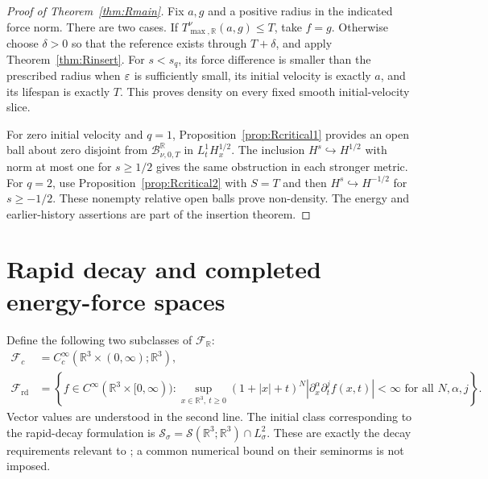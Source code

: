 \documentclass[11pt,a4paper]{article}
\theoremstyle{definition}\newtheorem{definition}[theorem]{Definition}
\theoremstyle{remark}\newtheorem{remark}[theorem]{Remark}
\newcommand{\R}{\mathbb R}\newcommand{\TT}{\mathbb T^3}
\begin{document}
\begin{proof}[Proof of Theorem~\ref{thm:Rmain}]
Fix $a,g$ and a positive radius in the indicated force norm. There are two cases. If $T^\nu_{\max,\R}(a,g)\le T$, take $f=g$. Otherwise choose $\delta>0$ so that the reference exists through $T+\delta$, and apply Theorem~\ref{thm:Rinsert}. For $s<s_q$, its force difference is smaller than the prescribed radius when $\varepsilon$ is sufficiently small, its initial velocity is exactly $a$, and its lifespan is exactly $T$. This proves density on every fixed smooth initial-velocity slice.

For zero initial velocity and $q=1$, Proposition~\ref{prop:Rcritical1} provides an open ball about zero disjoint from $\mathcal B^\R_{\nu,0,T}$ in $L^1_tH^{1/2}_x$. The inclusion $H^s\hookrightarrow H^{1/2}$ with norm at most one for $s\ge1/2$ gives the same obstruction in each stronger metric. For $q=2$, use Proposition~\ref{prop:Rcritical2} with $S=T$ and then $H^s\hookrightarrow H^{-1/2}$ for $s\ge-1/2$. These nonempty relative open balls prove non-density. The energy and earlier-history assertions are part of the insertion theorem.
\end{proof}

\section{Rapid decay and completed energy-force spaces}
Define the following two subclasses of $\mathcal F_{\R}$:
\begin{align*}
 \mathcal F_c&=C_c^\infty(\R^3\times(0,\infty);\R^3),\\
 \mathcal F_{\mathrm{rd}}
 &=\left\{f\in C^\infty(\R^3\times[0,\infty)):
 \sup_{x\in\R^3,\ t\ge0}(1+|x|+t)^N
       |\partial_x^\alpha\partial_t^jf(x,t)|<\infty
 \text{ for all }N,\alpha,j\right\}.
\end{align*}
Vector values are understood in the second line. The initial class corresponding to the rapid-decay formulation is $\mathcal S_\sigma=\mathcal S(\R^3;\R^3)\cap L^2_\sigma$. These are exactly the decay requirements relevant to \cite[equations (4)--(5)]{clay}; a common numerical bound on their seminorms is not imposed.
\end{document}

